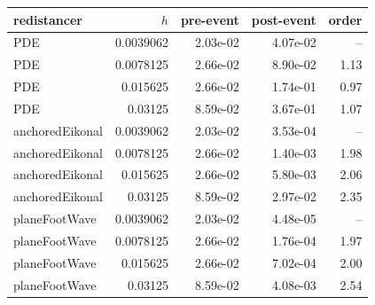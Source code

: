 \begin{tabular}{l r r r r}
\hline
redistancer & $h$ & pre-event & post-event & order \\
\hline
PDE & 0.0039062 & 2.03e-02 & 4.07e-02 & -- \\
PDE & 0.0078125 & 2.66e-02 & 8.90e-02 & 1.13 \\
PDE & 0.015625 & 2.66e-02 & 1.74e-01 & 0.97 \\
PDE & 0.03125 & 8.59e-02 & 3.67e-01 & 1.07 \\
\hline
anchoredEikonal & 0.0039062 & 2.03e-02 & 3.53e-04 & -- \\
anchoredEikonal & 0.0078125 & 2.66e-02 & 1.40e-03 & 1.98 \\
anchoredEikonal & 0.015625 & 2.66e-02 & 5.80e-03 & 2.06 \\
anchoredEikonal & 0.03125 & 8.59e-02 & 2.97e-02 & 2.35 \\
\hline
planeFootWave & 0.0039062 & 2.03e-02 & 4.48e-05 & -- \\
planeFootWave & 0.0078125 & 2.66e-02 & 1.76e-04 & 1.97 \\
planeFootWave & 0.015625 & 2.66e-02 & 7.02e-04 & 2.00 \\
planeFootWave & 0.03125 & 8.59e-02 & 4.08e-03 & 2.54 \\
\hline
\end{tabular}
